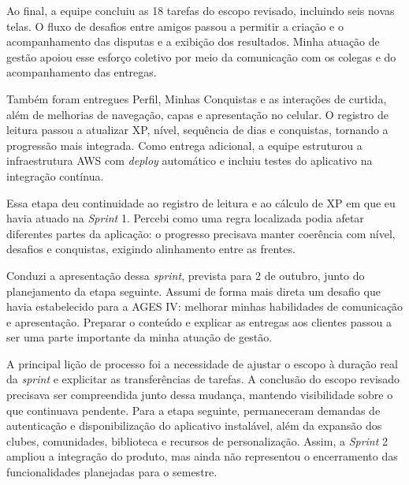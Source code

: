 Ao final, a equipe concluiu as 18 tarefas do escopo revisado, incluindo seis novas telas. O fluxo de desafios entre amigos passou a permitir a criação e o acompanhamento das disputas e a exibição dos resultados. Minha atuação de gestão apoiou esse esforço coletivo por meio da comunicação com os colegas e do acompanhamento das entregas.

Também foram entregues Perfil, Minhas Conquistas e as interações de curtida, além de melhorias de navegação, capas e apresentação no celular. O registro de leitura passou a atualizar \ac{XP}, nível, sequência de dias e conquistas, tornando a progressão mais integrada. Como entrega adicional, a equipe estruturou a infraestrutura \ac{AWS} com \textit{deploy} automático e incluiu testes do aplicativo na integração contínua.

Essa etapa deu continuidade ao registro de leitura e ao cálculo de \ac{XP} em que eu havia atuado na \textit{Sprint} 1. Percebi como uma regra localizada podia afetar diferentes partes da aplicação: o progresso precisava manter coerência com nível, desafios e conquistas, exigindo alinhamento entre as frentes.

Conduzi a apresentação dessa \textit{sprint}, prevista para 2 de outubro, junto do planejamento da etapa seguinte. Assumi de forma mais direta um desafio que havia estabelecido para a \ac{AGES} IV: melhorar minhas habilidades de comunicação e apresentação. Preparar o conteúdo e explicar as entregas aos clientes passou a ser uma parte importante da minha atuação de gestão.

A principal lição de processo foi a necessidade de ajustar o escopo à duração real da \textit{sprint} e explicitar as transferências de tarefas. A conclusão do escopo revisado precisava ser compreendida junto dessa mudança, mantendo visibilidade sobre o que continuava pendente. Para a etapa seguinte, permaneceram demandas de autenticação e disponibilização do aplicativo instalável, além da expansão dos clubes, comunidades, biblioteca e recursos de personalização. Assim, a \textit{Sprint} 2 ampliou a integração do produto, mas ainda não representou o encerramento das funcionalidades planejadas para o semestre.
